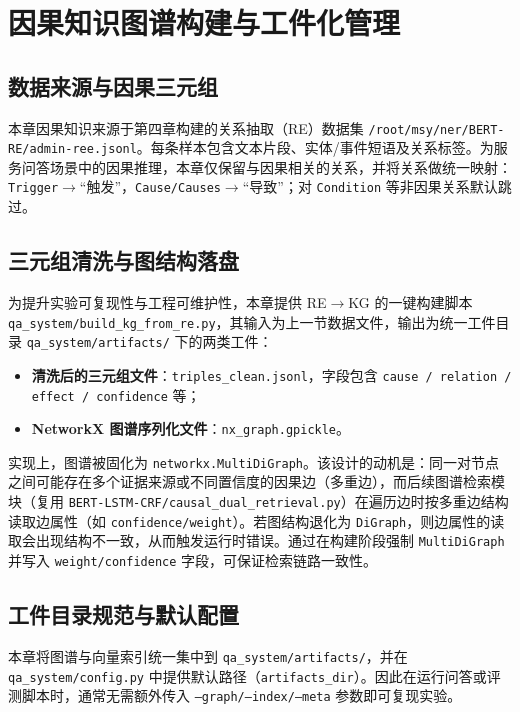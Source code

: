 \section{因果知识图谱构建与工件化管理}
\label{sec:kg_build}

\subsection{数据来源与因果三元组}
\label{subsec:kg_data}

本章因果知识来源于第四章构建的关系抽取（RE）数据集 \texttt{/root/msy/ner/BERT-RE/admin-ree.jsonl}。每条样本包含文本片段、实体/事件短语及关系标签。为服务问答场景中的因果推理，本章仅保留与因果相关的关系，并将关系做统一映射：\texttt{Trigger}$\rightarrow$“触发”，\texttt{Cause/Causes}$\rightarrow$“导致”；对 \texttt{Condition} 等非因果关系默认跳过。

\subsection{三元组清洗与图结构落盘}
\label{subsec:kg_artifacts}

为提升实验可复现性与工程可维护性，本章提供 RE$\rightarrow$KG 的一键构建脚本 \texttt{qa\_system/build\_kg\_from\_re.py}，其输入为上一节数据文件，输出为统一工件目录 \texttt{qa\_system/artifacts/} 下的两类工件：
\begin{itemize}
  \item \textbf{清洗后的三元组文件}：\texttt{triples\_clean.jsonl}，字段包含 \texttt{cause / relation / effect / confidence} 等；
  \item \textbf{NetworkX 图谱序列化文件}：\texttt{nx\_graph.gpickle}。
\end{itemize}

实现上，图谱被固化为 \texttt{networkx.MultiDiGraph}。该设计的动机是：同一对节点之间可能存在多个证据来源或不同置信度的因果边（多重边），而后续图谱检索模块（复用 \texttt{BERT-LSTM-CRF/causal\_dual\_retrieval.py}）在遍历边时按多重边结构读取边属性（如 \texttt{confidence/weight}）。若图结构退化为 \texttt{DiGraph}，则边属性的读取会出现结构不一致，从而触发运行时错误。通过在构建阶段强制 \texttt{MultiDiGraph} 并写入 \texttt{weight/confidence} 字段，可保证检索链路一致性。

\subsection{工件目录规范与默认配置}
\label{subsec:artifact_layout}

本章将图谱与向量索引统一集中到 \texttt{qa\_system/artifacts/}，并在 \texttt{qa\_system/config.py} 中提供默认路径（\texttt{artifacts\_dir}）。因此在运行问答或评测脚本时，通常无需额外传入 \texttt{--graph/--index/--meta} 参数即可复现实验。

